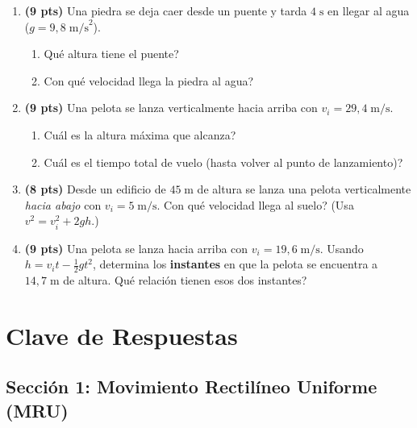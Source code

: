 \documentclass[12pt, letterpaper]{article}
\begin{document}
\begin{enumerate}[leftmargin=*]
  \item \textbf{(9 pts)} Una piedra se deja caer desde un puente y tarda $4\;\text{s}$ en llegar al agua ($g = 9{,}8\;\text{m/s}^2$).
        \begin{enumerate}[label=\alph*)]
          \item \textquestiondown Qué altura tiene el puente?
          \item \textquestiondown Con qué velocidad llega la piedra al agua?
        \end{enumerate}

  \item \textbf{(9 pts)} Una pelota se lanza verticalmente hacia arriba con $v_i = 29{,}4\;\text{m/s}$.
        \begin{enumerate}[label=\alph*)]
          \item \textquestiondown Cuál es la altura máxima que alcanza?
          \item \textquestiondown Cuál es el tiempo total de vuelo (hasta volver al punto de lanzamiento)?
        \end{enumerate}

  \item \textbf{(8 pts)} Desde un edificio de $45\;\text{m}$ de altura se lanza una pelota verticalmente \emph{hacia abajo} con $v_i = 5\;\text{m/s}$. \textquestiondown Con qué velocidad llega al suelo? (Usa $v^2 = v_i^2 + 2gh$.)

  \item \textbf{(9 pts)} Una pelota se lanza hacia arriba con $v_i = 19{,}6\;\text{m/s}$. Usando $h = v_i t - \frac{1}{2} g t^2$, determina los \textbf{instantes} en que la pelota se encuentra a $14{,}7\;\text{m}$ de altura. \textquestiondown Qué relación tienen esos dos instantes?
\end{enumerate}

\newpage

\ifmwclaves
  \section{Clave de Respuestas}

  \subsection*{Sección 1: Movimiento Rectilíneo Uniforme (MRU)}
\end{document}
